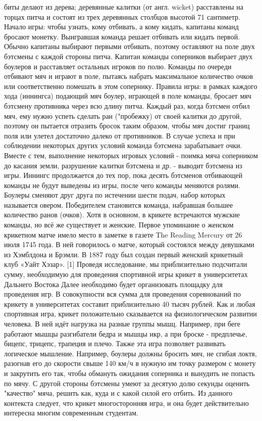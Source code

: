 биты делают из дерева; деревянные калитки (от англ. wicket) расставлены
на торцах питча и состоят из трех деревянных столбцов высотой 71 сантиметр.
Начало игры: чтобы узнать, кому отбивать, а кому кидать, капитаны команд бросают монетку. Выигравшая команда решает отбивать или
кидать первой. Обычно капитаны выбирают первыми отбивать, поэтому
оставляют на поле двух бэтсмены с каждой стороны питча. Капитан команды соперников выбирает двух боулеров и расставляет остальных игроков по полю. Команды по очереди отбивают мяч и играют в поле, пытаясь
набрать максимальное количество очков или соответственно помешать в
этом сопернику.
Правила игры: в рамках каждого хода (иннингса) подающий мяч
боулер, играющей в поле команды, бросает мяч бэтсмену противника через
всю длину питча. Каждый раз, когда бэтсмен отбил мяч, ему нужно успеть
сделать ран ("пробежку) от своей калитки до другой, поэтому он пытается
отразить бросок таким образом, чтобы мяч достиг границ поля или улетел
достаточно далеко от противников. В случае успеха и при соблюдении некоторых других условий команда бэтсмена зарабатывает очки. Вместе с
тем, выполнение некоторых игровых условий - поимка мяча соперником
до касания земли, разрушение калитки бэтсмена и др. - выводит бэтсмена
из игры. Иннингс продолжается до тех пор, пока десять бэтсменов отбивающей команды не будут выведены из игры, после чего команды меняются ролями. Боулеры сменяют друг друга по истечении шести подач,
набор которых называется овером. Победителем становится команда,
набравшая большее количество ранов (очков).
Хотя в основном, в крикете встречаются мужские команды, но всё
же существует и женские. Первое упоминание о женском крикетном матче
имело место в заметке в газете The Reading Mercury от 26 июля 1745 года.
В ней говорилось о матче, который состоялся между девушками из Хэмблдона и Брэмли. В 1887 году был создан первый женский крикетный клуб
«Уайт Хэзар». [1]
Проведя исследование, мы приблизительно подсчитали сумму, необходимую для проведения спортивной игры крикет в университетах Дальнего Востока 
Далее необходимо будет организовать площадку для проведения игр.
В совокупности вся сумма для проведения соревнований по крикету в университетах составит приблизительно 40 тысяч рублей.
Как и любая спортивная игра, крикет положительно сказывается на
физиологическом развитии человека. В ней идёт нагрузка на разные группы мышц. Например, при беге работают мышцы разгибатели бедра и
мышцы икр, а при броске - предплечье, бицепс, трицепс, трапеция и плечо.
Также эта игра позволяет развивать логическое мышление. Например, боулеры должны бросить мяч, не сгибая локтя, разогнав его до скорости
свыше 140 км/ч в нужную им точку размером с монету и закрутить его так,
чтобы обмануть ожидания соперника и вынудить не попасть по мячу. С
другой стороны бэтсмены умеют за десятую долю секунды оценить "качество" мяча, решить как, куда и с какой силой его отбить.
Из данного контекста следует, что крикет многосторонняя игра, и
она будет действительно интересна многим современным студентам. \cite{cricet}